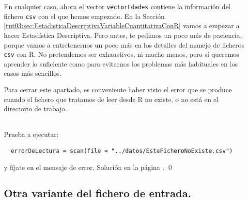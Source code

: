\documentclass[10pt,a4paper]{article}\usepackage[]{graphicx}\usepackage[]{color}
\newcounter {cont01}
\begin{document}
En cualquier caso, ahora el vector {\tt vectorEdades} contiene la información del fichero {\tt csv} con el que hemos  empezado. En la Sección \ref{tut03:sec:EstadisticaDescriptivaVariableCuantitativaConR} vamos a empezar a hacer Estadística Descriptiva. Pero antes, te pedimos un poco más de paciencia, porque vamos a entretenernos un poco más en los detalles del manejo de ficheros {\tt csv} con R. No pretendemos ser exhaustivos, ni mucho menos, pero sí queremos aprender lo suficiente como para evitarnos los problemas más habituales en los casos más sencillos.

Para cerrar este apartado, es conveniente haber visto el error que se produce cuando el fichero que tratamos de leer desde R no existe, o no está en el directorio de trabajo.
\begin{ejercicio}
\label{tut02:ejercicio04}
\quad\\
Prueba a ejecutar:
\begin{verbatim}
  errorDeLectura = scan(file = "../datos/EsteFicheroNoExiste.csv")
\end{verbatim}
y fíjate en el mensaje de error. Solución en la página \pageref{tut02:ejercicio04:sol}.
\qed
\end{ejercicio}

\subsection{Otra variante del fichero de entrada.}
\label{tut02:subsec:OtraVarianteFicheroEntrada}
\end{document}
